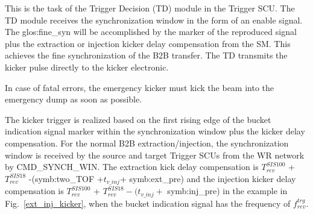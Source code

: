 This is the task of the Trigger Decision (TD) module in the Trigger SCU. The TD module receives the synchronization window in the form of an enable signal. The \gls{glos:fine_syn} will be accomplished by the marker of the reproduced signal plus the extraction or injection kicker delay compensation from the SM. This achieves the fine synchronization of the B2B transfer. The TD transmits the kicker pulse directly to the kicker electronic.  
 
In case of fatal errors, the emergency kicker must kick the beam into the emergency dump as soon as possible.

%

The kicker trigger is realized based on the first rising edge of the bucket indication signal marker within the synchronization window plus the kicker delay compensation. For the normal B2B extraction/injection, the synchronization window is received by the source and target Trigger SCUs from the WR network by CMD\_SYNCH\_WIN. The extraction kick delay compensation is $T_{\mathit{rev}}^{\mathit{SIS100}}$ + $T_{\mathit{rev}}^{\mathit{SIS18}}$ -(\gls{symb:two_TOF} +$ t_{v\_inj}$+ \gls{symb:ext_pre}) and the injection kicker delay compensation is $T_{\mathit{rev}}^{\mathit{SIS100}}$ + $T_{\mathit{rev}}^{\mathit{SIS18}} - (t_{v\_inj}+$ \gls{symb:inj_pre}) in the example in Fig.~\ref{ext_inj_kicker}, when the bucket indication signal has the frequency of $f_{\mathit{rev}}^{\mathit{trg}}$. 

